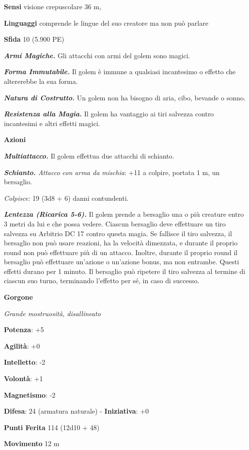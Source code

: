 \begin{multicols}{2}
\textbf{Sensi} visione crepuscolare 36 m, 

\textbf{Linguaggi} comprende le lingue del suo creatore ma non può
parlare

\textbf{Sfida} 10 (5.900 PE)\smallskip

\emph{\textbf{Armi Magiche.}} Gli attacchi con armi del golem sono
magici.

\emph{\textbf{Forma Immutabile.}} Il golem è immune a qualsiasi
incantesimo o effetto che altererebbe la sua forma.

\emph{\textbf{Natura di Costrutto.}} Un golem non ha bisogno di aria,
cibo, bevande o sonno.

\emph{\textbf{Resistenza alla Magia.}} Il golem ha vantaggio ai tiri
salvezza contro incantesimi e altri effetti magici.

\smallskip\textbf{Azioni}

\emph{\textbf{Multiattacco.}} Il golem effettua due attacchi di
schianto.

\emph{\textbf{Schianto.} Attacco con arma da mischia}: +11 a colpire,
portata 1 m, un bersaglio.

\emph{Colpisce:} 19 (3d8 + 6) danni contundenti.

\emph{\textbf{Lentezza (Ricarica 5-6).}} Il golem prende a bersaglio una
o più creature entro 3 metri da lui e che possa vedere. Ciascun
bersaglio deve effettuare un tiro salvezza su Arbitrio DC 17 contro
questa magia. Se fallisce il tiro salvezza, il bersaglio non può usare
reazioni, ha la velocità dimezzata, e durante il proprio round non può
effettuare più di un attacco. Inoltre, durante il proprio round il
bersaglio può effettuare un'azione o un'azione bonus, ma non entrambe.
Questi effetti durano per 1 minuto. Il bersaglio può ripetere il tiro
salvezza al termine di ciascun suo turno, terminando l'effetto per sé,
in caso di successo.

\textbf{Gorgone}

\emph{Grande mostruosità, disallineato}

\textbf{Potenza}: +5

\textbf{Agilità}: +0

\textbf{Intelletto}: -2

\textbf{Volontà}: +1

\textbf{Magnetismo}: -2

\textbf{Difesa}: 24 (armatura naturale) - \textbf{Iniziativa}: +0

\textbf{Punti Ferita} 114 (12d10 + 48)

\textbf{Movimento} 12 m


\end{multicols}
